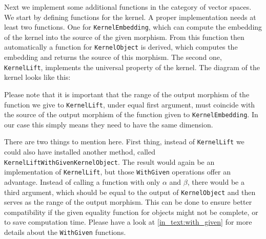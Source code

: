 Next we implement some additional functions in the category of vector spaces. We start by defining functions for the kernel.
A proper implementation needs at least two functions. One for \texttt{KernelEmbedding}, which can compute the embedding of the kernel
into the source of the given morphism. From this function then automatically a function for \texttt{KernelObject} is derived, which
computes the embedding and returns the source of this morphism. The second one, \texttt{KernelLift}, implements the universal property of the kernel.
The diagram of the kernel looks like this:
\begin{center}
\end{center}

Please note that it is important that the range of the output morphism of the function we give to \texttt{KernelLift},
under equal first argument, must coincide with the source of the output morphism of the function given to \texttt{KernelEmbedding}.
In our case this simply means they need to have the same dimension.



There are two things to mention here.
First thing, instead of \texttt{KernelLift} we could also have installed another method,
called \texttt{KernelLiftWithGivenKernelObject}. The result would again be an implementation of \texttt{KernelLift}, but those
\texttt{WithGiven} operations offer an advantage. Instead of calling a function with only $\alpha$ and $\beta$, there
would be a third argument, which should be equal to the output of \texttt{KernelObject} and then serves as the range of the output morphism.
This can be done to ensure better compatibility if the given equality function for objects might not be complete, or to save computation time.
Please have a look at \ref{in_text:with_given} for more details about the \texttt{WithGiven} functions.

